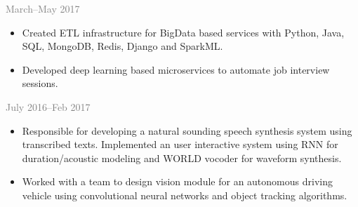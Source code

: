 \documentclass[]{mycv} %
\begin{document}
{{{\large\textbf{\color{lightgray}{Software Engineer, Intutent Inc., CA}}}\hfill{\textcolor{gray}{March--May 2017}}
\begin{itemize}
	\vspace{-0.5em}
	\setlength\itemsep{-0.2em}
\item Created ETL infrastructure for BigData based services with Python, Java, SQL, MongoDB, Redis, Django and SparkML.  
\item Developed deep learning based microservices to automate job interview sessions.  
\end{itemize}
{{\large\textbf{\color{lightgray}{Research Associate, Indraprastha Institute of Information Technology, Delhi}}}\hfill{\textcolor{gray}{July 2016--Feb 2017}}
	{\thinfont{\color{black}{}}}}
\begin{itemize}
	\vspace{-0.5em}
	\setlength\itemsep{-0.2em}	
		\item Responsible for developing a natural sounding speech synthesis system using transcribed texts. Implemented an user interactive system using RNN for duration/acoustic modeling and WORLD vocoder for waveform synthesis. 
		\item Worked with a team to design vision module for an autonomous driving vehicle using convolutional neural networks and object tracking algorithms.
\end{itemize}
}}
\end{document}
